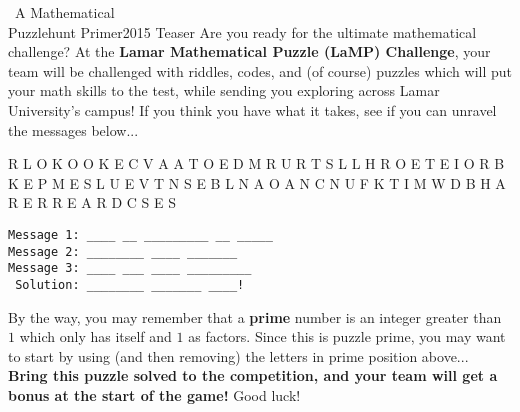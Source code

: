 
\begin{customPuzzle}{~}{A Mathematical\\ Puzzlehunt Primer}{2015 Teaser}
  Are you ready for the ultimate mathematical challenge?
  At the \textbf{Lamar Mathematical Puzzle (LaMP) Challenge}, your team will be
  challenged with riddles, codes, and (of course) puzzles which will put your
  math skills to the test, while sending you exploring across Lamar University's
  campus! If you think you have what it takes, see if you can unravel the
  messages below...

  \vspace{1em}
  {\Large
    \begin{centerverbatim}
    R L O K O O K E C V
    A A T O E D M R U R
    T S L L H R O E T E
    I O R B K E P M E S
    L U E V T N S E B L
    N A O A N C N U F K
    T I M W D B H A R E
    R R E A R D C S E S
    \end{centerverbatim}
  }

  {\huge
  \begin{verbatim}
Message 1: ____ __ _________ __ _____
Message 2: ________ ____ _______
Message 3: ____ ___ ____ _________
 Solution: ________ _______ ____!
  \end{verbatim}
  }

  By the way, you may remember that a \textbf{prime} number is an integer
  greater than $1$ which only has itself and $1$ as factors. Since this is
  puzzle prime, you may want to start by using (and then removing) the letters
  in prime
  position above... \textbf{Bring this puzzle solved to the competition,
  and your team will get a bonus at the start of the game!}
  Good luck!
\end{customPuzzle}